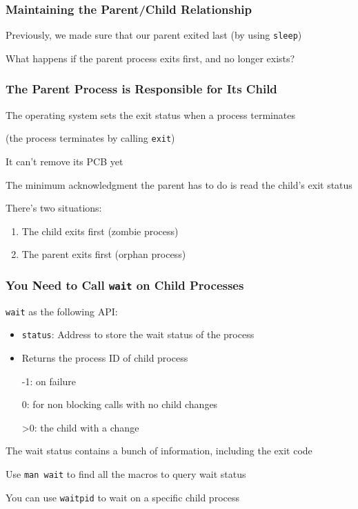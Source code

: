   \begin{frame}
    \frametitle{Maintaining the Parent/Child Relationship}

    Previously, we made sure that our parent exited last (by using \texttt{sleep})

    \vspace{2em}

    What happens if the parent process exits first, and no longer exists?
  \end{frame}

  \begin{frame}
    \frametitle{The Parent Process is Responsible for Its Child}

    The operating system sets the exit status when a process terminates
    
    (the process terminates by calling \texttt{exit})

    \hspace{2em} It can't remove its PCB yet

    \vspace{2em}

    The minimum acknowledgment the parent has to do is read the child's exit status

    \vspace{2em}

    There's two situations:
    \begin{enumerate}
      \item The child exits first (zombie process)
      \item The parent exits first (orphan process)
    \end{enumerate}
  \end{frame}

  \begin{frame}
    \frametitle{You Need to Call \texttt{wait} on Child Processes}

    \texttt{wait} as the following API:
    \begin{itemize}
      \item \texttt{status}: Address to store the wait status of the process
      \item Returns the process ID of child process

            \hspace{2em} -1: on failure

            \hspace{2em} 0: for non blocking calls with no child changes

            \hspace{2em} >0: the child with a change
    \end{itemize}

    \vspace{2em}

    The wait status contains a bunch of information, including the exit code

    \hspace{2em} Use \texttt{man wait} to find all the macros to query wait status

    \hspace{4em} You can use \texttt{waitpid} to wait on a specific child process
  \end{frame}

